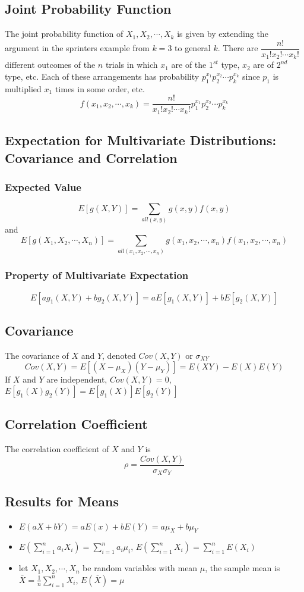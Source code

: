 \documentclass[11pt]{article}
\begin{document}
\subsection{Joint Probability Function}
The joint probability function of $X_1, X_2,\cdots, X_k$ is given by extending the argument in the sprinters example from $k=3$ to general $k$.
There are $\dfrac{n!}{x_1!x_2!\cdots x_k!}$ different outcomes of the $n$ trials in which $x_1$ are of the $1^{st}$ type, $x_2$ are of $2^{nd}$
type, etc. Each of these arrangements has probability $p_1^{x_1}p_2^{x_2}\cdots p_k^{x_k}$ since $p_1$ is multiplied $x_1$ times in some order, etc. 
\[f(x_1, x_2,\cdots, x_k) = \dfrac{n!}{x_1!x_2!\cdots x_k!}p_1^{x_1}p_2^{x_2}\cdots p_k^{x_k}\]
\subsection{Expectation for Multivariate Distributions: Covariance and Correlation}
\subsubsection{Expected Value}
\[E[g(X,Y)] = \sum_{all(x,y)}g(x,y)f(x,y)\]
and 
\[E[g(X_1,X_2,\cdots,X_n)] = \sum_{all(x_1,x_2,\cdots,x_n)}g(x_1,x_2,\cdots,x_n)f(x_1,x_2,\cdots,x_n)\]
\subsubsection{Property of Multivariate Expectation}
\[E[ag_1(X,Y) + bg_2(X,Y)] = aE[g_1(X,Y)] + bE[g_2(X,Y)]\]
\subsection{Covariance}
The covariance of $X$ and $Y$, denoted $Cov(X,Y)$ or $\sigma_{XY}$
\[Cov(X,Y) = E[(X-\mu_X)(Y-\mu_Y)] = E(XY)-E(X)E(Y)\]
If $X$ and $Y$ are independent, $Cov(X,Y) = 0$, $E[g_1(X)g_2(Y)] = E[g_1(X)]E[g_2(Y)]$
\subsection{Correlation Coefficient}
The correlation coefficient of $X$ and $Y$ is 
\[\rho = \dfrac{Cov(X,Y)}{\sigma_X\sigma_Y}\]
\subsection{Results for Means}
\begin{itemize}
    \item $E(aX+bY) = aE(x) + bE(Y) = a\mu_X + b\mu_Y$
    \item $E(\displaystyle\sum_{i=1}^{n}a_iX_i) = \sum_{i=1}^{n}a_i\mu_i$, $E(\displaystyle\sum_{i=1}^{n}X_i) = \sum_{i=1}^{n}E(X_i)$
    \item let $X_1,X_2,\cdots,X_n$ be random variables with mean $\mu$, the sample mean is $\overline{X} = \frac{1}{n}\displaystyle\sum_{i=1}^{n}X_i$, $E(\overline{X})=\mu$
\end{itemize}
\end{document}
